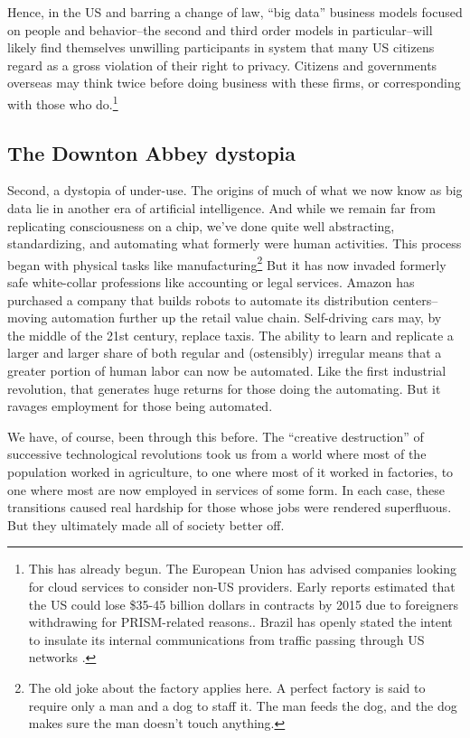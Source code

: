 \documentclass[12pt]{article}
\begin{document}
Hence, in the US and barring a change of law, ``big data'' business
models focused on people and behavior--the second and third order
models in particular--will likely find themselves unwilling
participants in system that many US citizens regard as a gross
violation of their right to privacy. Citizens and governments overseas may think
twice before doing business with these firms, or corresponding with
those who do.\footnote{This has already begun. The European Union has
  advised companies looking for cloud services to consider non-US
  providers. Early reports estimated that the US could lose \$35-45
  billion dollars in contracts by 2015 due to foreigners withdrawing
  for PRISM-related reasons.\citep{babcock2013}. Brazil has openly
  stated the intent to insulate its internal communications from
  traffic passing through US networks \citep{bbc2013brazil}.} 

\subsection{The Downton Abbey dystopia}
\label{sec:downt-abbey-dyst}

Second, a dystopia of under-use. The origins of much of what we now
know as big data lie in another era of artificial intelligence. And
while we remain far from replicating consciousness on a chip, we've
done quite well abstracting, standardizing, and automating what
formerly were human activities. This process began with physical tasks
like manufacturing\footnote{The old joke about the factory applies
  here. A perfect factory is said to require only a man and a dog to
  staff it. The man feeds the dog, and the dog makes sure the man
  doesn't touch anything.} But it has now invaded formerly safe
white-collar professions like accounting or legal services. Amazon has
purchased a company that builds robots to automate its distribution
centers--moving automation further up the retail value
chain. Self-driving cars may, by the middle of the 21st century,
replace taxis. The ability to learn and replicate a larger
and larger share of both regular and (ostensibly) irregular means that
a greater portion of human labor can now be automated. Like the first
industrial revolution, that generates huge returns for those doing the
automating. But it ravages employment for those being automated. 

We have, of course, been through this before. The ``creative
destruction'' of successive technological revolutions took us from a
world where most of the population worked in agriculture, to one where
most of it worked in factories, to one where most are now employed in
services of some form. In each case, these transitions caused real
hardship for those whose jobs were rendered superfluous. But they
ultimately made all of society better off. 
\end{document}
